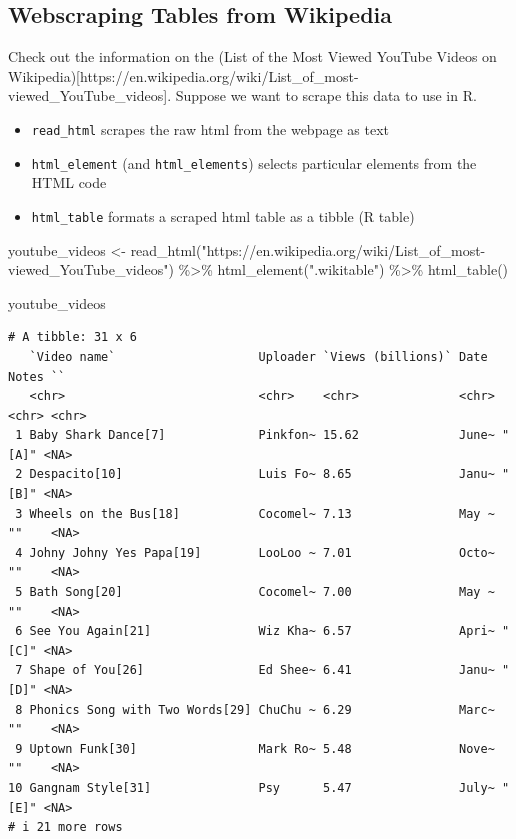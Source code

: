 \documentclass[
  letterpaper,
  DIV=11,
  numbers=noendperiod]{scrartcl}
\newenvironment{Shaded}{\begin{snugshade}}{\end{snugshade}}
\newcommand{\FunctionTok}[1]{\textcolor[rgb]{0.28,0.35,0.67}{#1}}
\newcommand{\NormalTok}[1]{\textcolor[rgb]{0.00,0.23,0.31}{#1}}
\newcommand{\OtherTok}[1]{\textcolor[rgb]{0.00,0.23,0.31}{#1}}
\newcommand{\SpecialCharTok}[1]{\textcolor[rgb]{0.37,0.37,0.37}{#1}}
\newcommand{\StringTok}[1]{\textcolor[rgb]{0.13,0.47,0.30}{#1}}
\providecommand{\tightlist}{%
  \setlength{\itemsep}{0pt}\setlength{\parskip}{0pt}}\usepackage{longtable,booktabs,array}
\begin{document}
\hypertarget{webscraping-tables-from-wikipedia}{%
\subsection{Webscraping Tables from
Wikipedia}\label{webscraping-tables-from-wikipedia}}

Check out the information on the (List of the Most Viewed YouTube Videos
on
Wikipedia){[}https://en.wikipedia.org/wiki/List\_of\_most-viewed\_YouTube\_videos{]}.
Suppose we want to scrape this data to use in R.

\begin{itemize}
\tightlist
\item
  \texttt{read\_html} scrapes the raw html from the webpage as text
\item
  \texttt{html\_element} (and \texttt{html\_elements}) selects
  particular elements from the HTML code
\item
  \texttt{html\_table} formats a scraped html table as a tibble (R
  table)
\end{itemize}

\begin{Shaded}
\begin{Highlighting}[]
\NormalTok{youtube\_videos }\OtherTok{\textless{}{-}} \FunctionTok{read\_html}\NormalTok{(}\StringTok{"https://en.wikipedia.org/wiki/List\_of\_most{-}viewed\_YouTube\_videos"}\NormalTok{) }\SpecialCharTok{\%\textgreater{}\%}
  \FunctionTok{html\_element}\NormalTok{(}\StringTok{".wikitable"}\NormalTok{) }\SpecialCharTok{\%\textgreater{}\%}
  \FunctionTok{html\_table}\NormalTok{() }

\NormalTok{youtube\_videos}
\end{Highlighting}
\end{Shaded}

\begin{verbatim}
# A tibble: 31 x 6
   `Video name`                    Uploader `Views (billions)` Date  Notes ``   
   <chr>                           <chr>    <chr>              <chr> <chr> <chr>
 1 Baby Shark Dance[7]             Pinkfon~ 15.62              June~ "[A]" <NA> 
 2 Despacito[10]                   Luis Fo~ 8.65               Janu~ "[B]" <NA> 
 3 Wheels on the Bus[18]           Cocomel~ 7.13               May ~ ""    <NA> 
 4 Johny Johny Yes Papa[19]        LooLoo ~ 7.01               Octo~ ""    <NA> 
 5 Bath Song[20]                   Cocomel~ 7.00               May ~ ""    <NA> 
 6 See You Again[21]               Wiz Kha~ 6.57               Apri~ "[C]" <NA> 
 7 Shape of You[26]                Ed Shee~ 6.41               Janu~ "[D]" <NA> 
 8 Phonics Song with Two Words[29] ChuChu ~ 6.29               Marc~ ""    <NA> 
 9 Uptown Funk[30]                 Mark Ro~ 5.48               Nove~ ""    <NA> 
10 Gangnam Style[31]               Psy      5.47               July~ "[E]" <NA> 
# i 21 more rows
\end{verbatim}
\end{document}
